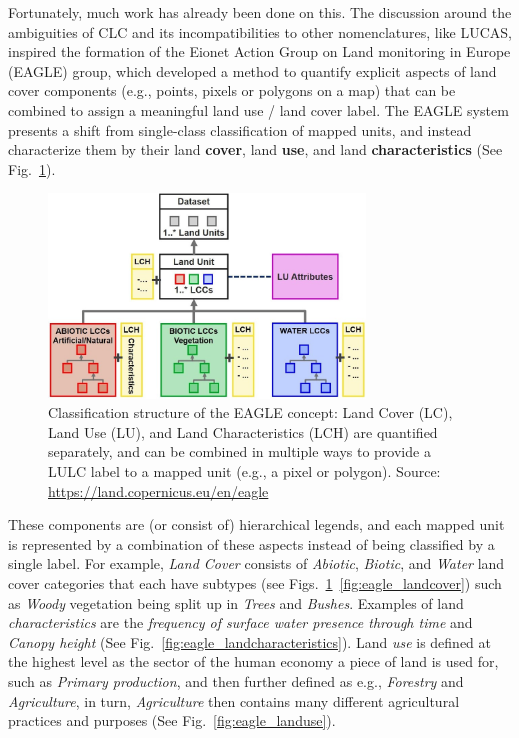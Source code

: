         Fortunately, much work has already been done on this. The discussion around the ambiguities of CLC and its incompatibilities to other nomenclatures, like LUCAS, inspired the formation of the Eionet Action Group on Land monitoring in Europe (EAGLE) group, which developed a method to quantify explicit aspects of land cover components (e.g., points, pixels or polygons on a map) that can be combined to assign a meaningful land use / land cover label. The EAGLE system presents a shift from single-class classification of mapped units, and instead characterize them by their land \textbf{cover}, land \textbf{use}, and land \textbf{characteristics} (See Fig.\@~\ref{fig:eagle_structure}). 
        
        \begin{figure}[H]
        \centering
        \includegraphics[width=0.75\textwidth]{figs_06/eagle_structure.png}
        \caption{Classification structure of the EAGLE concept: Land Cover (LC), Land Use (LU), and Land Characteristics (LCH) are quantified separately, and can be combined in multiple ways to provide a LULC label to a mapped unit (e.g., a pixel or polygon). Source: \url{https://land.copernicus.eu/en/eagle}}
        \label{fig:eagle_structure}
        \end{figure}
        
        These components are (or consist of) hierarchical legends, and each mapped unit is represented by a combination of these aspects instead of being classified by a single label. For example, \textit{Land Cover} consists of \textit{Abiotic}, \textit{Biotic}, and \textit{Water} land cover categories that each have subtypes (see Figs.\@~\ref{fig:eagle_structure}\@and\@~\ref{fig:eagle_landcover}) such as \textit{Woody} vegetation being split up in \textit{Trees} and \textit{Bushes}. Examples of land \textit{characteristics} are the \textit{frequency of surface water presence through time} \citep{pekel2016high} and \textit{Canopy height} \citep{potapov2021mapping} (See Fig.\@~\ref{fig:eagle_landcharacteristics}). Land \textit{use} is defined at the highest level as the sector of the human economy a piece of land is used for, such as \textit{Primary production}, and then further defined as e.g., \textit{Forestry} and \textit{Agriculture}, in turn, \textit{Agriculture} then contains many different agricultural practices and purposes (See Fig.\@~\ref{fig:eagle_landuse}).
        
